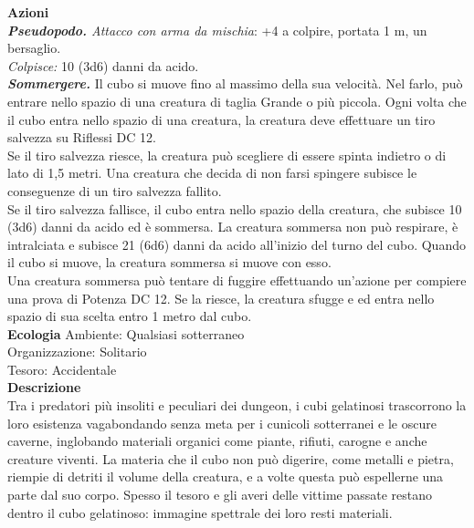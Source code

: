 \begin{multicols}{2}
\smallskip\textbf{Azioni}\\

\emph{\textbf{Pseudopodo.} Attacco con arma da mischia}: +4 a colpire, portata 1 m, un bersaglio.\\

\emph{Colpisce:} 10 (3d6) danni da acido.\\

\emph{\textbf{Sommergere.}} Il cubo si muove fino al massimo della sua velocità. Nel farlo, può entrare nello spazio di una creatura di taglia Grande o più piccola. Ogni volta che il cubo entra nello spazio di una creatura, la creatura deve effettuare un tiro salvezza su Riflessi DC 12.\\

Se il tiro salvezza riesce, la creatura può scegliere di essere spinta indietro o di lato di 1,5 metri. Una creatura che decida di non farsi spingere subisce le conseguenze di un tiro salvezza fallito.\\

Se il tiro salvezza fallisce, il cubo entra nello spazio della creatura, che subisce 10 (3d6) danni da acido ed è sommersa. La creatura sommersa non può respirare, è intralciata e subisce 21 (6d6) danni da acido all'inizio del turno del cubo. Quando il cubo si muove, la creatura sommersa si muove con esso.\\

Una creatura sommersa può tentare di fuggire effettuando un'azione per compiere una prova di Potenza DC 12. Se la riesce, la creatura sfugge e ed entra nello spazio di sua scelta entro 1 metro dal cubo.\\
\textbf{Ecologia}
Ambiente: Qualsiasi sotterraneo\\
Organizzazione: Solitario\\
Tesoro: Accidentale\\
\textbf{Descrizione}\\
Tra i predatori più insoliti e peculiari dei dungeon, i cubi gelatinosi trascorrono la loro esistenza vagabondando senza meta per i cunicoli sotterranei e le oscure caverne, inglobando materiali organici come piante, rifiuti, carogne e anche creature viventi. La materia che il cubo non può digerire, come metalli e pietra, riempie di detriti il volume della creatura, e a volte questa può espellerne una parte dal suo corpo. Spesso il tesoro e gli averi delle vittime passate restano dentro il cubo gelatinoso: immagine spettrale dei loro resti materiali.\\


\end{multicols}
